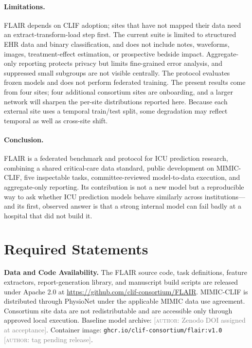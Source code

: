 \documentclass[12pt]{article}
\newcommand{\confirm}[1]{\textcolor{gray}{[\textsc{author}: #1]}}
\begin{document}
\paragraph{Limitations.} FLAIR depends on CLIF adoption; sites that have not mapped their data need an extract-transform-load step first. The current suite is limited to structured EHR data and binary classification, and does not include notes, waveforms, images, treatment-effect estimation, or prospective bedside impact. Aggregate-only reporting protects privacy but limits fine-grained error analysis, and suppressed small subgroups are not visible centrally. The protocol evaluates frozen models and does not perform federated training. The present results come from four sites; four additional consortium sites are onboarding, and a larger network will sharpen the per-site distributions reported here. Because each external site uses a temporal train/test split, some degradation may reflect temporal as well as cross-site shift.

\paragraph{Conclusion.} FLAIR is a federated benchmark and protocol for ICU prediction research, combining a shared critical-care data standard, public development on MIMIC-CLIF, five inspectable tasks, committee-reviewed model-to-data execution, and aggregate-only reporting. Its contribution is not a new model but a reproducible way to ask whether ICU prediction models behave similarly across institutions---and its first, observed answer is that a strong internal model can fail badly at a hospital that did not build it.

\section*{Required Statements}

\textbf{Data and Code Availability.} The FLAIR source code, task definitions, feature extractors, report-generation library, and manuscript build scripts are released under Apache 2.0 at \url{https://github.com/clif-consortium/FLAIR}. MIMIC-CLIF is distributed through PhysioNet under the applicable MIMIC data use agreement. Consortium site data are not redistributable and are accessible only through approved local execution. Baseline model archive: \confirm{Zenodo DOI assigned at acceptance}. Container image: \texttt{ghcr.io/clif-consortium/flair:v1.0} \confirm{tag pending release}.
\end{document}
